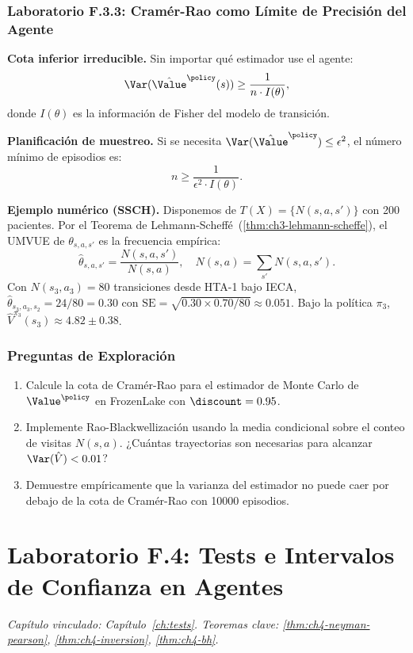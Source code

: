 \subsubsection*{Laboratorio F.3.3: Cramér-Rao como Límite de Precisión del Agente}

\textbf{Cota inferior irreducible.} Sin importar qué estimador use el agente:
\[
    \Var(\hat{\Value}^\policy(s)) \geq \frac{1}{n \cdot I(\theta)},
\]
donde $I(\theta)$ es la información de Fisher del modelo de transición.

\textbf{Planificación de muestreo.} Si se necesita
$\Var(\hat{\Value}^\policy) \leq \epsilon^2$, el número mínimo de episodios es:
\[
    n \geq \frac{1}{\epsilon^2 \cdot I(\theta)}.
\]

\textbf{Ejemplo numérico (SSCH).}
Disponemos de $T(X) = \{N(s,a,s')\}$ con 200 pacientes.
Por el Teorema de Lehmann-Scheffé~(\ref{thm:ch3-lehmann-scheffe}), el UMVUE
de $\theta_{s,a,s'}$ es la frecuencia empírica:
\[
    \hat\theta_{s,a,s'} = \frac{N(s,a,s')}{N(s,a)},
    \quad N(s,a) = \sum_{s'} N(s,a,s').
\]
Con $N(s_3,a_3) = 80$ transiciones desde HTA-1 bajo IECA,
$\hat\theta_{s_3,a_3,s_2} = 24/80 = 0.30$
con $\mathrm{SE} = \sqrt{0.30 \times 0.70 / 80} \approx 0.051$.
Bajo la política $\pi_3$, $\hat{V}^{\pi_3}(s_3) \approx 4.82 \pm 0.38$.
\label{ex:ssch-cap03}

\subsubsection*{Preguntas de Exploración}

\begin{enumerate}
    \item Calcule la cota de Cramér-Rao para el estimador de Monte Carlo
          de $\Value^\policy$ en FrozenLake con $\discount=0.95$.
    \item Implemente Rao-Blackwellización usando la media condicional
          sobre el conteo de visitas $N(s,a)$. ¿Cuántas trayectorias
          son necesarias para alcanzar $\Var(\hat{V}) < 0.01$?
    \item Demuestre empíricamente que la varianza del estimador no puede
          caer por debajo de la cota de Cramér-Rao con 10000 episodios.
\end{enumerate}

\section{Laboratorio F.4: Tests e Intervalos de Confianza en Agentes}
\label{lab:F4}
\textit{Capítulo vinculado: Capítulo~\ref{ch:tests}.
Teoremas clave: \ref{thm:ch4-neyman-pearson}, \ref{thm:ch4-inversion},
\ref{thm:ch4-bh}.}

